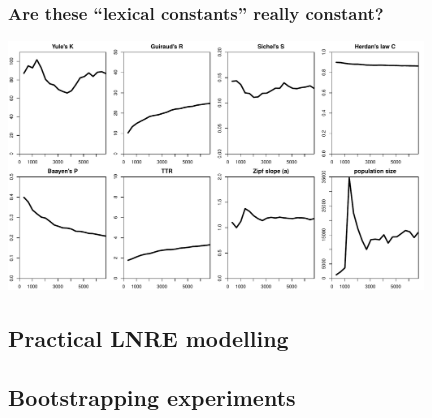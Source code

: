 \documentclass[t]{beamer} %
\begin{document}
\begin{frame}[c]
  \frametitle{Are these ``lexical constants'' really constant?}

  \centering
  \includegraphics[width=11cm]{img/bare_bncS_obs_lexical_constants}
\end{frame}

\subsection{Practical LNRE modelling}

\begin{frame}[c]
  \begin{center}
  \end{center}
\end{frame}




\subsection{Bootstrapping experiments}
\end{document}
